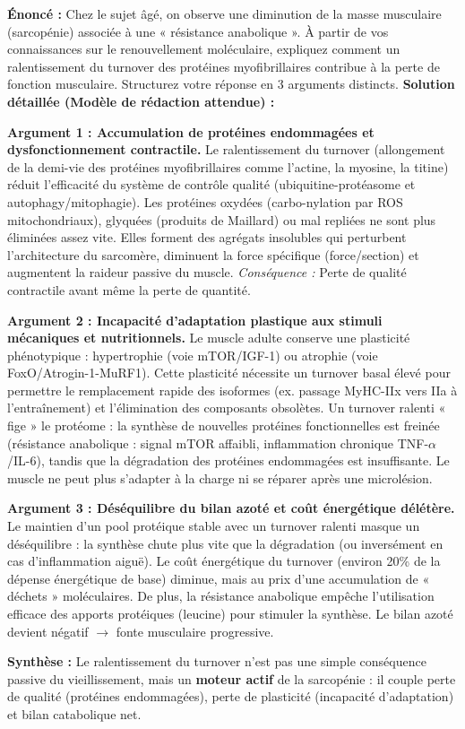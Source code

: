 \documentclass[11pt]{article}
\begin{document}
\begin{exoresolu}
\textbf{Énoncé :} Chez le sujet âgé, on observe une diminution de la masse musculaire (sarcopénie) associée à une « résistance anabolique ». À partir de vos connaissances sur le renouvellement moléculaire, expliquez comment un ralentissement du turnover des protéines myofibrillaires contribue à la perte de fonction musculaire. Structurez votre réponse en 3 arguments distincts.
\tcblower
\textbf{Solution détaillée (Modèle de rédaction attendue) :}

\textbf{Argument 1 : Accumulation de protéines endommagées et dysfonctionnement contractile.}
Le ralentissement du turnover (allongement de la demi-vie des protéines myofibrillaires comme l'actine, la myosine, la titine) réduit l'efficacité du système de contrôle qualité (ubiquitine-protéasome et autophagy/mitophagie). Les protéines oxydées (carbo-nylation par ROS mitochondriaux), glyquées (produits de Maillard) ou mal repliées ne sont plus éliminées assez vite. Elles forment des agrégats insolubles qui perturbent l'architecture du sarcomère, diminuent la force spécifique (force/section) et augmentent la raideur passive du muscle. \emph{Conséquence :} Perte de qualité contractile avant même la perte de quantité.

\textbf{Argument 2 : Incapacité d'adaptation plastique aux stimuli mécaniques et nutritionnels.}
Le muscle adulte conserve une plasticité phénotypique : hypertrophie (voie mTOR/IGF-1) ou atrophie (voie FoxO/Atrogin-1-MuRF1). Cette plasticité nécessite un turnover basal élevé pour permettre le remplacement rapide des isoformes (ex. passage MyHC-IIx vers IIa à l'entraînement) et l'élimination des composants obsolètes. Un turnover ralenti « fige » le protéome : la synthèse de nouvelles protéines fonctionnelles est freinée (résistance anabolique : signal mTOR affaibli, inflammation chronique TNF-$\alpha$/IL-6), tandis que la dégradation des protéines endommagées est insuffisante. Le muscle ne peut plus s'adapter à la charge ni se réparer après une microlésion.

\textbf{Argument 3 : Déséquilibre du bilan azoté et coût énergétique délétère.}
Le maintien d'un pool protéique stable avec un turnover ralenti masque un déséquilibre : la synthèse chute plus vite que la dégradation (ou inversément en cas d'inflammation aiguë). Le coût énergétique du turnover (environ 20\% de la dépense énergétique de base) diminue, mais au prix d'une accumulation de « déchets » moléculaires. De plus, la résistance anabolique empêche l'utilisation efficace des apports protéiques (leucine) pour stimuler la synthèse. Le bilan azoté devient négatif $\rightarrow$ fonte musculaire progressive.

\textbf{Synthèse :} Le ralentissement du turnover n'est pas une simple conséquence passive du vieillissement, mais un \textbf{moteur actif} de la sarcopénie : il couple perte de qualité (protéines endommagées), perte de plasticité (incapacité d'adaptation) et bilan catabolique net.
\end{exoresolu}
\end{document}

